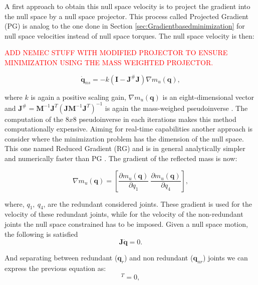 A first approach to obtain this null space velocity is to project the gradient into the null space by a null space projector. This process called Projected Gradient (PG) \cite{PG_RG} is analog to the one done in Section \ref{sec:Gradientbasedminimization} for null space velocities instead of null space torques. The null space velocity is then:

\textcolor{red}{ADD NEMEC STUFF WITH MODIFIED PROJECTOR TO ENSURE MINIMIZATION USING THE MASS WEIGHTED PROJECTOR.}

\begin{equation}
\mathbf{\dot{q}}_{ns} =  - k (\mathbf{I} -  \mathbf{J}^{\#} \mathbf{J} ) \nabla m_u(\mathbf{q}), \label{eq:RG_dq}
\end{equation}

where  $k$ is again a positive scaling gain,  $\nabla m_u(\mathbf{q})$ is an eight-dimensional vector and $ \mathbf{J}^{\#} = \mathbf{M}^{-1} \mathbf{J}^{T} (\mathbf{J} \mathbf{M}^{-1} \mathbf{J}^{T})^{-1}$ is again the mass-weighed pseudoinverse \cite{khatib1995}. The computation of the $8x8$ pseudoinverse in each iterations makes this method computationally expensive. Aiming for real-time capabilities another approach is consider where the minimization problem has the dimension of the null space. This one named Reduced Gradient (RG) and is in general  analytically simpler and numerically faster than PG \cite{reduced_gradient}.
The gradient of the reflected mass is now:

\begin{equation}
\nabla m_u(\mathbf{q}) = \left[
\frac{\partial {m_u(\mathbf{q})}}{\partial {q_1}} \   \frac{\partial {m_u(\mathbf{q})}}{\partial {q_4}} \right], \label{eq:grad_refl_mass_RG}
\end{equation}

where,  $q_1 , \ q_4$,  are the redundant considered joints. These gradient is used for the velocity of these redundant joints, while for the velocity of the non-redundant joints the null space constrained has to be imposed. Given a null space motion, the following is satisfied
\begin{equation}
\mathbf{J} \dot{\mathbf{q}} = 0 .
\label{eq:ns_motion}
\end{equation}

And separating between redundant (${\mathbf{q}}_{r}$) and non redundant (${\mathbf{q}}_{nr}$) joints we can express the previous equation as:
\begin{equation}
[\mathbf{J}_r \mathbf{J}_{nr}] [\mathbf{\dot{q}}_r \dot{\mathbf{q}}_{nr}]^T = 0    ,
\label{eq:}
\end{equation}

